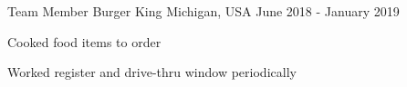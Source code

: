 \begin{cventries}
   \cventry
   {Team Member} %
   {Burger King} %
   {Michigan, USA} %
   {June 2018 - January 2019}
   {
      \begin{cvitems}
         \item {Cooked food items to order}
         \item {Worked register and drive-thru window periodically}
      \end{cvitems}
   }

\end{cventries}
